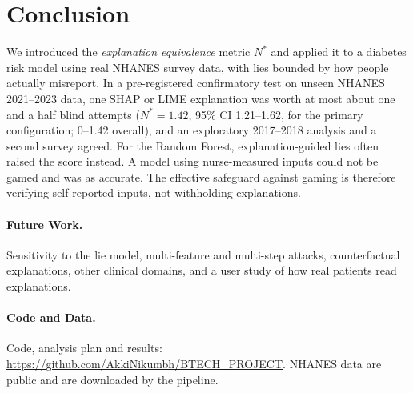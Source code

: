 \documentclass[sigconf,nonacm]{acmart}
\begin{document}
\section{Conclusion}

We introduced the \emph{explanation equivalence} metric $N^*$ and
applied it to a diabetes risk model using real NHANES survey data,
with lies bounded by how people actually misreport.  In a
pre-registered confirmatory test on unseen NHANES 2021--2023 data, one
SHAP or LIME explanation was worth at most about one and a half blind
attempts ($N^* = 1.42$, 95\% CI 1.21--1.62, for the primary
configuration; 0--1.42 overall), and an exploratory 2017--2018 analysis
and a second survey agreed.  For the Random Forest, explanation-guided
lies often raised the score instead.  A model using nurse-measured
inputs could not be gamed and was as accurate.  The effective
safeguard against gaming is therefore verifying self-reported inputs,
not withholding explanations.

\paragraph{Future Work.}
Sensitivity to the lie model, multi-feature and multi-step attacks,
counterfactual explanations, other clinical domains, and a user study
of how real patients read explanations.

\paragraph{Code and Data.}
Code, analysis plan and results:
\url{https://github.com/AkkiNikumbh/BTECH_PROJECT}.  NHANES data are
public and are downloaded by the pipeline.




\end{document}
